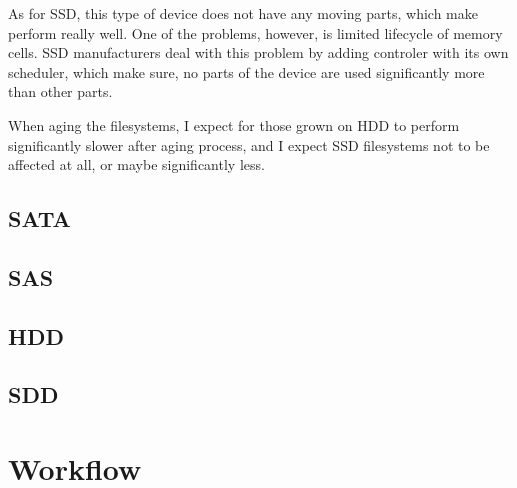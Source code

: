 \documentclass[
  color, %
  table, %
  lof,   %
  lot,   %
]{fithesis3}
\begin{document}
As for SSD, this type of device does not have any moving parts, which make perform really well. One of the problems, however, is limited lifecycle of memory cells. SSD manufacturers deal with this problem by adding controler with its own scheduler, which make sure, no parts of the device are used significantly more than other parts.

When aging the filesystems, I expect for those grown on HDD to perform significantly slower after aging process, and I expect SSD filesystems not to be affected at all, or maybe significantly less.


\section{SATA}
\section{SAS}
\section{HDD}
\section{SDD}

\chapter{Workflow}


\end{document}
